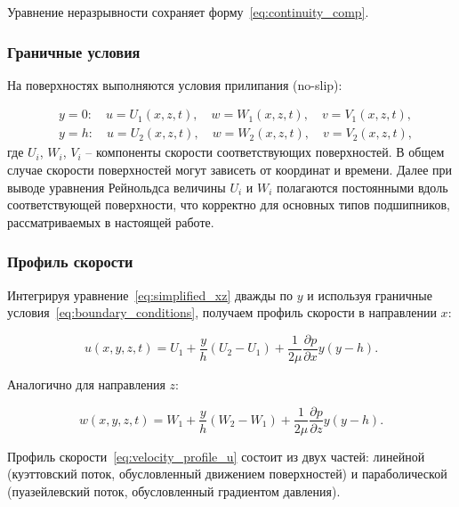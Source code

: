 Уравнение неразрывности сохраняет форму~\eqref{eq:continuity_comp}.

\subsubsection*{Граничные условия}

На поверхностях выполняются условия прилипания (no-slip):

\begin{equation}
\begin{aligned}
&y = 0: \quad u = U_1(x, z, t), \quad w = W_1(x, z, t), \quad v = V_1(x, z, t), \\
&y = h: \quad u = U_2(x, z, t), \quad w = W_2(x, z, t), \quad v = V_2(x, z, t),
\end{aligned}
\label{eq:boundary_conditions}
\end{equation}
где $U_i$, $W_i$, $V_i$ -- компоненты скорости соответствующих поверхностей. В общем случае скорости поверхностей могут зависеть от координат и времени. Далее при выводе уравнения Рейнольдса величины $U_i$ и $W_i$ полагаются постоянными вдоль соответствующей поверхности, что корректно для основных типов подшипников, рассматриваемых в настоящей работе.

\subsubsection*{Профиль скорости}

Интегрируя уравнение~\eqref{eq:simplified_xz} дважды по $y$ и используя граничные условия~\eqref{eq:boundary_conditions}, получаем профиль скорости в направлении $x$:

\begin{equation}
u(x, y, z, t) = U_1 + \frac{y}{h}(U_2 - U_1) + \frac{1}{2\mu}\frac{\partial p}{\partial x}y(y - h).
\label{eq:velocity_profile_u}
\end{equation}

Аналогично для направления $z$:

\begin{equation}
w(x, y, z, t) = W_1 + \frac{y}{h}(W_2 - W_1) + \frac{1}{2\mu}\frac{\partial p}{\partial z}y(y - h).
\label{eq:velocity_profile_w}
\end{equation}

Профиль скорости~\eqref{eq:velocity_profile_u} состоит из двух частей: линейной (куэттовский поток, обусловленный движением поверхностей) и параболической (пуазейлевский поток, обусловленный градиентом давления).

